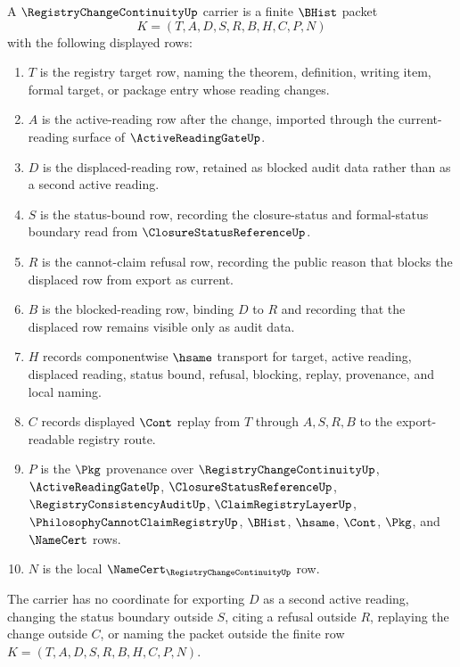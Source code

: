 \begin{definition}
\label{def:registry-change-continuity-carrier}
A $\RegistryChangeContinuityUp$ carrier is a finite $\BHist$ packet
$$
K=(T,A,D,S,R,B,H,C,P,N)
$$
with the following displayed rows:
\begin{enumerate}
\item $T$ is the registry target row, naming the theorem, definition, writing item, formal target, or package entry whose reading changes.
\item $A$ is the active-reading row after the change, imported through the current-reading surface of $\ActiveReadingGateUp$.
\item $D$ is the displaced-reading row, retained as blocked audit data rather than as a second active reading.
\item $S$ is the status-bound row, recording the closure-status and formal-status boundary read from $\ClosureStatusReferenceUp$.
\item $R$ is the cannot-claim refusal row, recording the public reason that blocks the displaced row from export as current.
\item $B$ is the blocked-reading row, binding $D$ to $R$ and recording that the displaced row remains visible only as audit data.
\item $H$ records componentwise $\hsame$ transport for target, active reading, displaced reading, status bound, refusal, blocking, replay, provenance, and local naming.
\item $C$ records displayed $\Cont$ replay from $T$ through $A,S,R,B$ to the export-readable registry route.
\item $P$ is the $\Pkg$ provenance over $\RegistryChangeContinuityUp$, $\ActiveReadingGateUp$, $\ClosureStatusReferenceUp$, $\RegistryConsistencyAuditUp$, $\ClaimRegistryLayerUp$, $\PhilosophyCannotClaimRegistryUp$, $\BHist$, $\hsame$, $\Cont$, $\Pkg$, and $\NameCert$ rows.
\item $N$ is the local $\NameCert_{\RegistryChangeContinuityUp}$ row.
\end{enumerate}
The carrier has no coordinate for exporting $D$ as a second active reading, changing the status boundary outside $S$, citing a refusal outside $R$, replaying the change outside $C$, or naming the packet outside the finite row $K=(T,A,D,S,R,B,H,C,P,N)$.
\end{definition}

